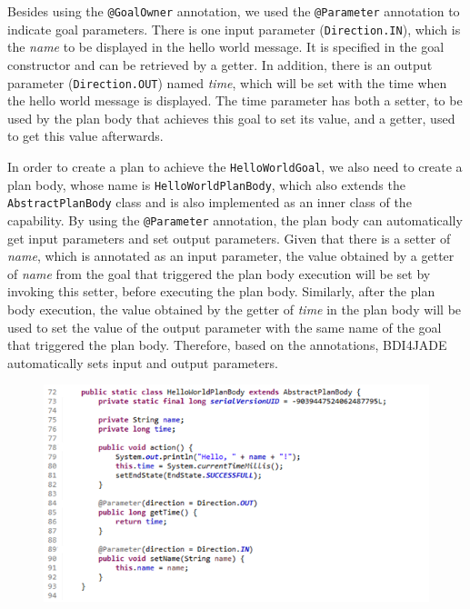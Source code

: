 \documentclass{article}
\begin{document}
Besides using the \texttt{@GoalOwner} annotation, we used the \texttt{@Parameter} annotation to indicate goal parameters. There is one input parameter (\texttt{Direction.IN}), which is the \emph{name} to be displayed in the hello world message. It is specified in the goal constructor and can be retrieved by a getter. In addition, there is an output parameter (\texttt{Direction.OUT}) named \emph{time}, which will be set with the time when the hello world message is displayed. The time parameter has both a setter, to be used by the plan body that achieves this goal to set its value, and a getter, used to get this value afterwards.

In order to create a plan to achieve the \texttt{HelloWorldGoal}, we also need to create a plan body, whose name is \texttt{HelloWorldPlanBody}, which also extends the \texttt{AbstractPlanBody} class and is also implemented as an inner class of the capability. By using the \texttt{@Parameter} annotation, the plan body can automatically get input parameters and set output parameters. Given that there is a setter of \emph{name}, which is annotated as an input parameter, the value obtained by a getter of \emph{name} from the goal that triggered the plan body execution will be set by invoking this setter, before executing the plan body. Similarly, after the plan body execution, the value obtained by the getter of \emph{time} in the plan body will be used to set the value of the output parameter with the same name of the goal that triggered the plan body. Therefore, based on the annotations, BDI4JADE automatically sets input and output parameters.

\begin{figure}[!h]
\centering
\includegraphics[width=\linewidth]{CapaPlan}
\label{fig:capaplan}
\end{figure}
\end{document}

